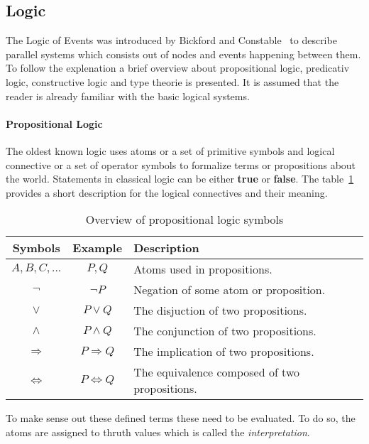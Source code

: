 \subsection{Logic}

The Logic of Events was introduced by Bickford and
Constable~\cite{bickford2003logic} to describe parallel systems which
consists out of nodes and events happening between them. To follow
the explenation a brief overview about propositional logic, predicativ logic,
constructive logic and type theorie is presented. It is assumed that the reader
is already familiar with the basic logical systems.

\paragraph{Propositional Logic}
The oldest known logic uses atoms or a set of primitive symbols and logical
connective or a set of operator symbols to formalize
terms or propositions about the world. Statements in classical logic can be either
\textbf{true} or \textbf{false}. The table~\ref{tab:proplogic} provides
a short description for the logical connectives and their meaning.~\cite{heinemann2013logik}

\begin{table}[h]
  \centering
  \begin{tabular}{c|c|l}
    Symbols & Example & Description\\\hline
    $A,B,C,...$ & $P, Q$ & Atoms used in propositions.\\
    $\neg$ & $\neg P$ & Negation of some atom or proposition.\\
    $\vee$ & $P \vee Q$ & The disjuction of two propositions.\\
    $\wedge$ & $P \wedge Q$ & The conjunction of two propositions.\\
    $\Rightarrow$ & $P \Rightarrow Q$ & The implication of two propositions.\\
    $\Leftrightarrow$ & $P \Leftrightarrow Q$ & The equivalence composed of two propositions.\\
  \end{tabular}
  \caption{Overview of propositional logic symbols}
  \label{tab:proplogic}
\end{table}

To make sense out these defined terms these need to be evaluated. To do so,
the atoms are assigned to thruth values which is called the \textit{interpretation}.~\cite{tuschik1994mathematische}


